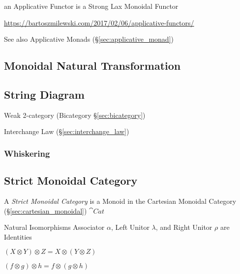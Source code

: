 an Applicative Functor is a Strong Lax Monoidal Functor

\url{https://bartoszmilewski.com/2017/02/06/applicative-functors/}

\fist See also Applicative Monads (\S\ref{sec:applicative_monad})



\subsection{Monoidal Natural Transformation}
\label{sec:monoidal_natural_transformation}

\subsection{String Diagram}\label{sec:string_diagram}

Weak 2-category (Bicategory \S\ref{sec:bicategory})

Interchange Law (\S\ref{sec:interchange_law})



\subsubsection{Whiskering}\label{sec:whiskering}



\subsection{Strict Monoidal Category}\label{sec:strict_monoidal}

A \emph{Strict Monoidal Category} is a Monoid in the Cartesian
Monoidal Category (\S\ref{sec:cartesian_monoidal}) $\cat{Cat}$

Natural Isomorphisms Associator $\alpha$, Left Unitor $\lambda$, and
Right Unitor $\rho$ are Identities

$(X \otimes Y) \otimes Z = X \otimes (Y \otimes Z)$

$(f \otimes g) \otimes h = f \otimes (g \otimes h)$

